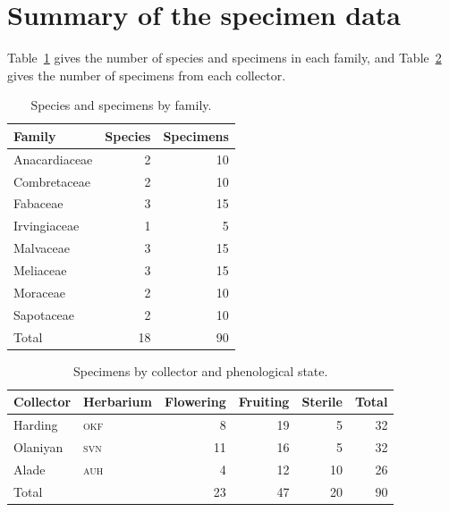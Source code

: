 \section{Summary of the specimen data}
Table~\ref{tab:family-summary} gives the number of species and
specimens in each family, and Table~\ref{tab:collector-summary} gives
the number of specimens from each collector.

\begin{table}[htbp]
	\centering
	\caption{Species and specimens by family.}
	\label{tab:family-summary}
	\begin{tabular}{@{}lrr@{}}
		\toprule
		Family & Species & Specimens \\
		\midrule
		Anacardiaceae & 2 & 10 \\
		Combretaceae  & 2 & 10 \\
		Fabaceae      & 3 & 15 \\
		Irvingiaceae  & 1 &  5 \\
		Malvaceae     & 3 & 15 \\
		Meliaceae     & 3 & 15 \\
		Moraceae      & 2 & 10 \\
		Sapotaceae    & 2 & 10 \\
		\midrule
		Total         & 18 & 90 \\
		\bottomrule
	\end{tabular}
\end{table}

\begin{table}[htbp]
	\centering
	\caption{Specimens by collector and phenological state.}
	\label{tab:collector-summary}
	\begin{tabular}{@{}llrrrr@{}}
		\toprule
		Collector & Herbarium & Flowering & Fruiting & Sterile & Total \\
		\midrule
		Harding   & \textsc{okf} &  8 & 19 &  5 & 32 \\
		Olaniyan  & \textsc{svn} & 11 & 16 &  5 & 32 \\
		Alade     & \textsc{auh} &  4 & 12 & 10 & 26 \\
		\midrule
		Total     &              & 23 & 47 & 20 & 90 \\
		\bottomrule
	\end{tabular}
\end{table}